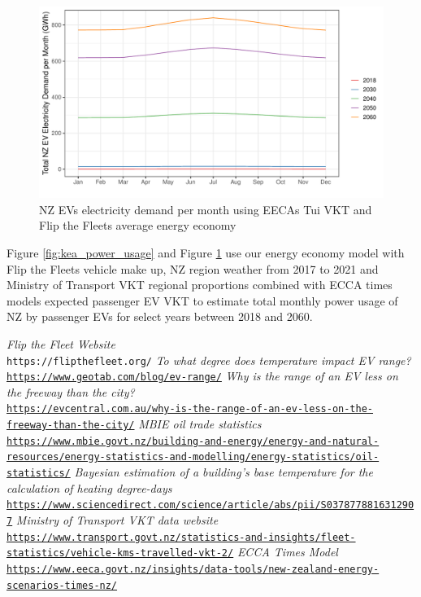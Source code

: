 \documentclass[
]{article}
\begin{document}
\begin{figure}
\centering
\includegraphics{final_report_files/figure-latex/tui_power_usage-1.pdf}
\caption{NZ EVs electricity demand per month using EECAs Tui VKT and
Flip the Fleets average energy economy\label{fig:tui_power_usage}}
\end{figure}

Figure \ref{fig:kea_power_usage} and Figure \ref{fig:tui_power_usage}
use our energy economy model with Flip the Fleets vehicle make up, NZ
region weather from 2017 to 2021 and Ministry of Transport VKT regional
proportions combined with ECCA times models expected passenger EV VKT to
estimate total monthly power usage of NZ by passenger EVs for select
years between 2018 and 2060.

\begin{thebibliography}{9}
\textit{Flip the Fleet Website}
\\\texttt{https://flipthefleet.org/}
\textit{To what degree does temperature impact EV range?}
\\\texttt{\url{https://www.geotab.com/blog/ev-range/}}
\textit{Why is the range of an EV less on the freeway than the city?}
\\\texttt{\url{https://evcentral.com.au/why-is-the-range-of-an-ev-less-on-the-freeway-than-the-city/}}
\textit{MBIE oil trade statistics}
\\\texttt{\url{https://www.mbie.govt.nz/building-and-energy/energy-and-natural-resources/energy-statistics-and-modelling/energy-statistics/oil-statistics/}}
\textit{Bayesian estimation of a building's base temperature for the calculation of heating degree-days}
\\\texttt{\url{https://www.sciencedirect.com/science/article/abs/pii/S0378778816312907}}
\textit{Ministry of Transport VKT data website}
\\\texttt{\url{https://www.transport.govt.nz/statistics-and-insights/fleet-statistics/vehicle-kms-travelled-vkt-2/}}
\textit{ECCA Times Model}
\\\texttt{\url{https://www.eeca.govt.nz/insights/data-tools/new-zealand-energy-scenarios-times-nz/}}
\end{thebibliography}
\end{document}

